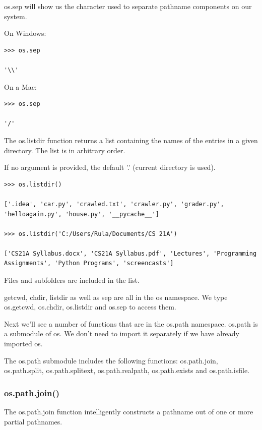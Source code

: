 \documentclass{article}
\begin{document}
os.sep will show us the character used to separate pathname components on our system.

On Windows:

\begin{lstlisting}
>>> os.sep

'\\'
\end{lstlisting}

On a Mac:

\begin{lstlisting}
>>> os.sep

'/'
\end{lstlisting}

The os.listdir function returns a list containing the names of the entries in a given directory.   The list is in arbitrary order.

If no argument is provided, the default '.' (current directory is used).

\begin{lstlisting}
>>> os.listdir()  

['.idea', 'car.py', 'crawled.txt', 'crawler.py', 'grader.py', 'helloagain.py', 'house.py', '__pycache__']

>>> os.listdir('C:/Users/Rula/Documents/CS 21A') 

['CS21A Syllabus.docx', 'CS21A Syllabus.pdf', 'Lectures', 'Programming Assignments', 'Python Programs', 'screencasts']
\end{lstlisting}

Files and subfolders are included in the list.

getcwd, chdir, listdir as well as sep are all in the os namespace.   We type os.getcwd, os.chdir, os.listdir and os.sep to access them.

Next we’ll see a number of functions that are in the os.path namespace.  os.path is a submodule of os.  We don’t need to import it separately if we have already imported os.

The os.path submodule includes the following functions:  os.path.join, os.path.split, os.path.splitext, os.path.realpath, os.path.exists and os.path.isfile.

\subsubsection{os.path.join()}

The os.path.join function intelligently constructs a pathname out of one or more partial pathnames. 
\end{document}
